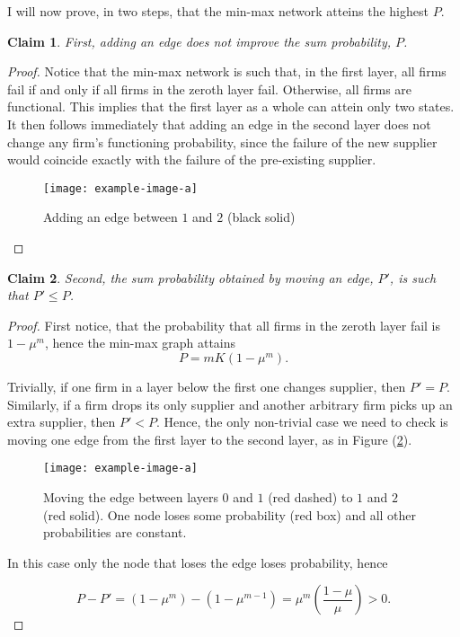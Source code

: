 \documentclass[american, abstract=on]{scrartcl}
\newcommand{\inputTikZ}[2]{%
    \scalebox{#1}{}  
    }
\theoremstyle{plain}
\newtheorem{claim}{Claim}
\begin{document}
I will now prove, in two steps, that the min-max network atteins the highest $P$.

\begin{claim} \label{claim:min-max:first}
    First, adding an edge does not improve the sum probability, $P$. \end{claim} \begin{proof}
    Notice that the min-max network is such that, in the first layer, all firms fail if and only if all firms in the zeroth layer fail. Otherwise, all firms are functional. This implies that the first layer as a whole can attein only two states. It then follows immediately that adding an edge in the second layer does not change any firm's functioning probability, since the failure of the new supplier would coincide exactly with the failure of the pre-existing supplier.

    \begin{figure}[H]
        \centering
        \texttt{[image: example-image-a]}
        \caption{Adding an edge between $1$ and $2$ (black solid)} \label{fig:adding-an-edge}
    \end{figure}


\end{proof}

\begin{claim} \label{claim:min-max:second}
    Second, the sum probability obtained by moving an edge, $P'$, is such that $P' \leq P$.
\end{claim}
\begin{proof}
    First notice, that the probability that all firms in the zeroth layer fail is $1 - \mu^m$, hence the min-max graph attains
    \begin{equation}
        P = m K (1 - \mu^{m}).
    \end{equation}

    Trivially, if one firm in a layer below the first one changes supplier, then $P' = P$. Similarly, if a firm drops its only supplier and another arbitrary firm picks up an extra supplier, then $P' < P$. Hence, the only non-trivial case we need to check is moving one edge from the first layer to the second layer, as in Figure (\ref{fig:min-max-moving-edge}).

    \begin{figure}[H]
        \centering
        \texttt{[image: example-image-a]}
        \caption{Moving the edge between layers $0$ and $1$ (red dashed) to $1$ and $2$ (red solid). One node loses some probability (red box) and all other probabilities are constant.} \label{fig:min-max-moving-edge}
    \end{figure}

    In this case only the node that loses the edge loses probability, hence

    \begin{equation}
        P - P' = (1 - \mu^m) - (1 - \mu^{m-1}) = \mu^m \left(\frac{1 - \mu}{\mu}\right) > 0.
    \end{equation}
\end{proof}
\end{document}
